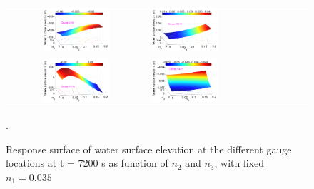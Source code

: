 \begin{figure}[ht]
\centering

\begin{tabular}{clcl}
\includegraphics[width=0.5\textwidth]{./figures/response_i1_t2.pdf} &
\includegraphics[width=0.5\textwidth]{./figures/response_i2_t2.pdf} \\
\includegraphics[width=0.5\textwidth]{./figures/response_i3_t2.pdf} &
\includegraphics[width=0.5\textwidth]{./figures/response_i4_t2.pdf}
\end{tabular}
\caption{Response surface of water surface elevation at the different gauge locations at t = 7200 s
as function of $n_2$ and $n_3$, with fixed $n_1=0.035$}.
\label{fig:response2}
\end{figure}
